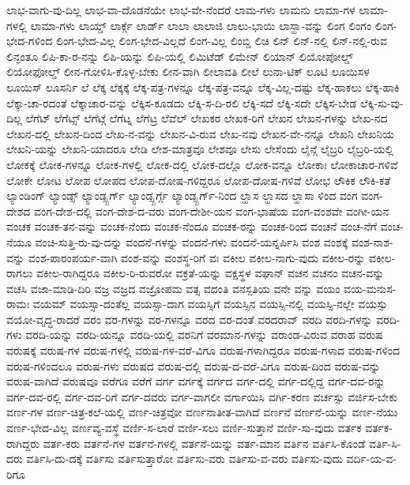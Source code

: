 {ಲಾಭ-ವಾಗು-ವು-ದಿಲ್ಲ
ಲಾಭ-ವಾ-ದೊಡನೆಯೇ
ಲಾಭ-ವೇ-ನೆಂದರೆ
ಲಾಮ-ಗಳು
ಲಾಮನು
ಲಾಮಾ-ಗಳ
ಲಾಮಾ-ಗಳಲ್ಲಿ
ಲಾಮಾ-ಗಳು
ಲಾಯ್ಡ್
ಲಾರ್ಕ್ಗೆ
ಲಾರ್ಡ್
ಲಾಲಾ
ಲಾಲಾಜಿ
ಲಾಲು-ಭಾಯಿ
ಲಾಸ್ಹಾ-ವನ್ನು
ಲಿಂಗ
ಲಿಂಗಂ
ಲಿಂಗ-ಭೇದ-ಗಳಿಂದ
ಲಿಂಗ-ಭೇದ-ವಿಲ್ಲ
ಲಿಂಗ-ಭೇದ-ವಿಲ್ಲದೆ
ಲಿಂಗ-ವಿಲ್ಲ
ಲಿಂಬ್ಡಿ
ಲಿಚಿ
ಲಿನ್
ಲಿನ್-ನಲ್ಲಿ
ಲಿನ್-ನಲ್ಲಿ-ರುವ
ಲಿನ್ಳಂತೂ
ಲಿಪಿ-ಕಾ-ರ-ನನ್ನು
ಲಿಪಿ-ಯನ್ನು
ಲಿಪಿ-ಯಲ್ಲಿ
ಲಿಮಿಟೆಡ್
ಲಿಮೇನ್
ಲಿಯಾನ್
ಲಿಯೋಪೋಲ್ಡ್
ಲಿಯೋಫೋಲ್ಡ್
ಲೀನ-ಗೋಳಿಸಿ-ಕೊಳ್ಳ-ಬೇಕು
ಲೀನ-ವಾಗಿ
ಲೀಲಾವತಿ
ಲೀಲೆ
ಲುನಾ-ಟಿಕ್
ಲೂಟಿ
ಲೂಯಿಸಳ
ಲೂಯಿಸ್
ಲೂಸರ್ನಿ
ಲೆ
ಲೆಕ್ಕ
ಲೆಕ್ಕಕ್ಕೆ
ಲೆಕ್ಕ-ಪತ್ರ-ಗಳನ್ನೂ
ಲೆಕ್ಕ-ಪತ್ರ-ವನ್ನೂ
ಲೆಕ್ಕ-ವಿಲ್ಲ-ದಷ್ಟು
ಲೆಕ್ಕ-ಹಾಕಲು
ಲೆಕ್ಕ-ಹಾಕಿ
ಲೆಕ್ಕಾ-ಚಾ-ರದಂತೆ
ಲೆಕ್ಕಾಚಾರ-ವನ್ನು
ಲೆಕ್ಕಿಸ-ಕೂಡದು
ಲೆಕ್ಕಿ-ಸ-ದಿ-ರಲಿ
ಲೆಕ್ಕಿ-ಸದೆ
ಲೆಕ್ಕಿ-ಸದೇ
ಲೆಕ್ಕಿಸ-ಬೇಡ
ಲೆಕ್ಕಿ-ಸು-ವು-ದಿಲ್ಲ
ಲೆಗೆಟ್
ಲೆಗೆಟ್ಸ್
ಲೆಗೆಟ್ಗೆ
ಲೆಗೆಟ್ನ
ಲೆಗೆಟ್ರ
ಲೆವೆಲ್
ಲೇಖಕರ
ಲೇಖಕ-ರಿಗೆ
ಲೇಖನ
ಲೇಖನ-ಗಳನ್ನು
ಲೇಖ-ನದ
ಲೇಖನ-ದಲ್ಲಿ
ಲೇಖನ-ದಿಂದ
ಲೇಖ-ನ-ವನ್ನು
ಲೇಖನ-ವಿ-ರುವ
ಲೇಖ-ನವು
ಲೇಖನ-ವೇ-ನನ್ನೂ
ಲೇಖನಿ
ಲೇಖನಿಯ
ಲೇಖನಿ-ಯನ್ನು
ಲೇಖನಿ-ಯಾದರೂ
ಲೇಡಿ
ಲೇಶ-ಮಾತ್ರವೂ
ಲೇಶವೂ
ಲೇಸು
ಲೇಸೆಂದು
ಲೈನ್ಗೆ
ಲೈಬ್ರರಿ
ಲೈಬ್ರರಿ-ಯಲ್ಲಿ
ಲೋಕಕ್ಕೆ
ಲೋಕ-ಗಳನ್ನೂ
ಲೋಕ-ಗಳಲ್ಲಿ
ಲೋಕ-ದಲ್ಲಿ
ಲೋಕ-ದಲ್ಲೊ
ಲೋಕ-ವನ್ನೂ
ಲೋಕಾಃ
ಲೋಕಾಚಾರ-ಗಳಿವೆ
ಲೋಕೇ
ಲೋಟ
ಲೋಪ
ಲೋಪದ
ಲೋಪ-ದೋಷ-ಗಳಿದ್ದರೂ
ಲೋಪ-ದೋಷ-ಗಳಿವೆ
ಲೋಭ
ಲೌಕಿಕ
ಲೌಕಿ-ಕತೆ
ಲ್ಯಾಂಡಿಂಗ್
ಲ್ಯಾಂಡ್ಸ್
ಲ್ಯಾಂಡ್ಸ್ಬರ್ಗ್
ಲ್ಯಾಂಡ್ಸ್ಬರ್ಗ್ಗೆ
ಲ್ಯಾಂಡ್ಸ್ಬರ್ಗ್-ನಿಂದ
ಲ್ಹಾಸ
ಲ್ಹಾಸದ
ಲ್ಹಾಸಾ
ಳಿಂದ
ವಂಗ
ವಂಗ-ದೇಶದ
ವಂಗ-ದೇಶ-ದಲ್ಲಿ
ವಂಗ-ದೇಶ-ದ-ವರು
ವಂಗ-ದೇಶೀ-ಯನ
ವಂಗ-ಭಾಷೆಯ
ವಂಗ-ವಂಶವೇ
ವಂಗೀ-ಯನ
ವಂಚಕ
ವಂಚಕ-ತನ-ವನ್ನು
ವಂಚಕ-ನೆಂದು
ವಂಚಕ-ನೆಂದೂ
ವಂಚಕ-ರನ್ನು
ವಂಚಕ-ರಿಂದ
ವಂಚನೆ
ವಂಚ-ನೆಗೆ
ವಂಚ-ನೆಯೂ
ವಂಚಿ-ಸುತ್ತಿ-ರು-ವು-ದನ್ನು
ವಂದನೆ-ಗಳನ್ನು
ವಂದನೆ-ಗಳು
ವಂದನೆ-ಯನ್ನರ್ಪಿಸಿ
ವಂಶ
ವಂಶಕ್ಕೆ
ವಂಶ-ನಾಶ-ವನ್ನು
ವಂಶ-ಪಾರಂಪರ್ಯ-ವಾಗಿ
ವಂಶ-ವನ್ನು
ವಂಶಸ್ಥ-ರಿಗೆ
ವಃ
ವಕೀಲ
ವಕೀಲ-ನಾಗು-ವುದು
ವಕೀಲ-ರನ್ನು
ವಕೀಲ-ರಾಗಲು
ವಕೀಲ-ರಾಗಿದ್ದರೂ
ವಕೀಲ-ರಿ-ರುವರೋ
ವಕ್ರತೆ-ಯನ್ನು
ವಕ್ಷಸ್ಥಳ
ವಘಾನ್
ವಚನ
ವಚನಂ
ವಚನ-ವನ್ನು
ವಚಸಿ
ವಜಾ-ಮಾಡಿ-ದಿರಿ
ವಜ್ರ
ವಜ್ರದ
ವಜ್ರೋಪಮ
ವತ್ಸ
ವದಂತಿ
ವನಸ್ಪತಿಯ
ವನೇ
ವನ್ನು
ವಯಂ
ವಯ-ಮನುಸ-ರಾಮಃ
ವಯಮ್
ವಯಸ್ಸಾ-ದಂತೆಲ್ಲ
ವಯಸ್ಸಾ-ದಾಗ
ವಯಸ್ಸಿಗೆ
ವಯಸ್ಸಿನ
ವಯಸ್ಸಿ-ನಲ್ಲಿ
ವಯಸ್ಸಿ-ನಲ್ಲೇ
ವಯಸ್ಸು
ವಯೋ-ವೃದ್ಧ-ರಾದರೆ
ವರಂ
ವರ-ಗಳನ್ನು
ವರ-ಗಳನ್ನೂ
ವರದ
ವರ-ದಂತೆ
ವರದರಾವ್
ವರದಿ
ವರದಿ-ಗಳನ್ನು
ವರದಿ-ಗಳು
ವರದಿ-ಯನ್ನು
ವರದಿ-ಯನ್ನೂ
ವರದಿ-ಯಲ್ಲಿ
ವರನಿಗೆ
ವರಮಾನ-ಗಳನ್ನು
ವರಾಂಡ-ವಿರುವ
ವರಾಹ
ವರುಷ
ವರುಷಕ್ಕೆ
ವರುಷ-ಗಳ
ವರುಷ-ಗಳಲ್ಲಿ
ವರುಷ-ಗಳ-ವರೆ-ವಿಗೂ
ವರುಷ-ಗಳಾಗಿದ್ದರೂ
ವರುಷ-ಗಳಾದ
ವರುಷ-ಗಳಿಂದ
ವರುಷ-ಗಳಿಂದಲೂ
ವರುಷ-ಗಳು
ವರುಷದ
ವರುಷ-ದಲ್ಲಿ
ವರುಷ-ದ-ವರೆ-ವಿಗೂ
ವರುಷ-ದಿಂದ
ವರುಷ-ವನ್ನು
ವರುಷ-ವಾಗಿದೆ
ವರುಷವೂ
ವರೆಗೂ
ವರೆಗೆ
ವರ್ಗ
ವರ್ಗಕ್ಕೆ
ವರ್ಗದ
ವರ್ಗ-ದಲ್ಲಿ
ವರ್ಗ-ದಲ್ಲಿದ್ದ
ವರ್ಗ-ದವ-ರನ್ನು
ವರ್ಗ-ದವ-ರಲ್ಲಿ
ವರ್ಗ-ದವ-ರಿಗೆ
ವರ್ಗ-ದವರು
ವರ್ಗ-ವಾಗಲೀ
ವರ್ಗಾಯಿಸಿ
ವರ್ಗಿ-ಕರಣ
ವರ್ಚಸ್ಸು
ವರ್ಜಿಸ-ಬೇಕು
ವರ್ಣ-ಗಳ
ವರ್ಣ-ಚಿತ್ರ-ಕಲೆ-ಯಲ್ಲಿ
ವರ್ಣ-ಚಿತ್ರವೋ
ವರ್ಣನಾತೀತ-ವಾಗಿದೆ
ವರ್ಣನೆ
ವರ್ಣನೆ-ಯನ್ನು
ವರ್ಣ-ನೆಯು
ವರ್ಣ-ಭೇದ-ವಿಲ್ಲ
ವರ್ಣವ್ಯ-ವಸ್ಥೆ
ವರ್ಣಿ-ಸ-ಲಾರೆ
ವರ್ಣಿ-ಸಲು
ವರ್ಣಿ-ಸುತ್ತಾನೆ
ವರ್ಣಿ-ಸು-ವುದು
ವರ್ತಕ
ವರ್ತಕ-ರಾಗಿದ್ದರು
ವರ್ತ-ಕರು
ವರ್ತನೆ-ಗಳ
ವರ್ತನೆ-ಗಳಲ್ಲಿ
ವರ್ತನೆ-ಯನ್ನು
ವರ್ತ-ಮಾನ
ವರ್ತಿನ
ವರ್ತಿಸಿ-ಕೊಂಡೆ
ವರ್ತಿ-ಸಿ-ದರು
ವರ್ತಿಸಿ-ದು-ದಕ್ಕೆ
ವರ್ತಿಸು
ವರ್ತಿಸುತ್ತಾರೋ
ವರ್ತಿಸು-ವರು
ವರ್ತಿಸು-ವ-ವರು
ವರ್ತಿಸು-ವುದು
ವರ್ದಿ-ಯ-ವ-ರಿಗೂ
}
